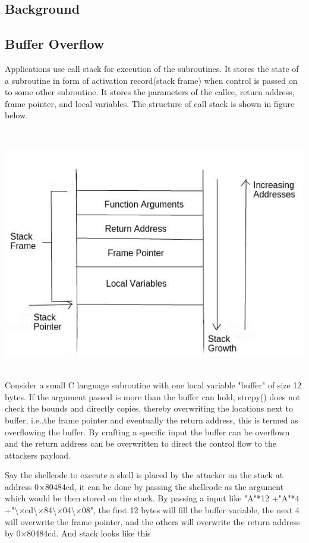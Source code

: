 \documentclass{article}
\begin{document}
\begin{multicols}{2}
	\section{Background}
	
	\subsection{Buffer Overflow}
	Applications use call stack for execution of the subroutines. It stores the state of a subroutine in form of activation record(stack frame) when control is passed on to some other subroutine. It stores the parameters of the callee, return address, frame pointer, and local variables. The structure of call stack is shown in figure below.
	
	\
	\
	
	\includegraphics[scale=.4]{stack_normal.jpg}
	\
	\
	\
	
	Consider a small C language subroutine with one local variable "buffer" of size 12 bytes. If the argument passed is more than the buffer can hold, strcpy() does not check the bounds and directly copies, thereby overwriting the locations next to buffer, i.e.,the frame pointer and eventually the return address, this is termed as overflowing the buffer. By crafting a specific input the buffer can be overflown and the return address can be overwritten to direct the control flow to the attackers payload. 
	
	Say the shellcode to execute a shell is placed by the attacker on the stack at address 0$\times$80484cd, it can be done by passing the shellcode as the argument which would be then stored on the stack. By passing a input like "A"*12 +"A"*4 +"\textbackslash $\times$cd\textbackslash $\times$84\textbackslash $\times$04\textbackslash $\times$08", the first 12 bytes will fill the buffer variable, the next 4 will overwrite the frame pointer, and the others will overwrite the return address by 0$\times$80484cd. And stack looks like this
	


\end{multicols}
\end{document}
